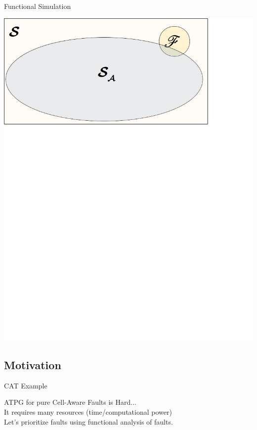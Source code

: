 \documentclass{beamer}
\begin{document}
\begin{frame}{Functional Simulation}
\begin{center}
\includegraphics[scale=0.55]{Images/sd4.png}
\end{center}
\end{frame}

\subsection{Motivation}
\begin{frame}{CAT Example}
\begin{center}
ATPG for pure Cell-Aware Faults is Hard... \\
\pause It requires many resources (time/computational power) \\ 
\pause Let's prioritize faults using functional analysis of faults.
\end{center}
\end{frame}
\end{document}
